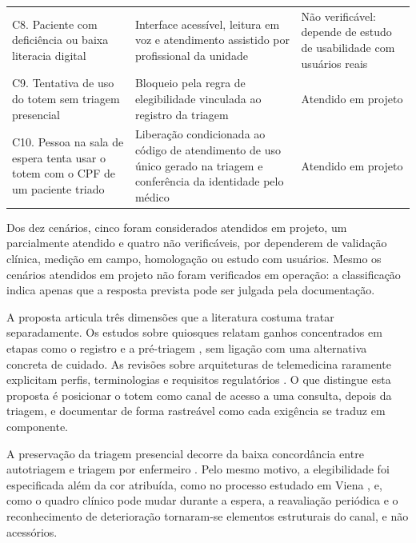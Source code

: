{\begin{longtable}{L{3.6cm} L{5.3cm} L{5.0cm}}
C8. Paciente com deficiência ou baixa literacia digital & Interface acessível, leitura em voz e atendimento assistido por profissional da unidade & Não verificável: depende de estudo de usabilidade com usuários reais \\
C9. Tentativa de uso do totem sem triagem presencial & Bloqueio pela regra de elegibilidade vinculada ao registro da triagem & Atendido em projeto \\
C10. Pessoa na sala de espera tenta usar o totem com o CPF de um paciente triado & Liberação condicionada ao código de atendimento de uso único gerado na triagem e conferência da identidade pelo médico & Atendido em projeto \\
\end{longtable}
}

Dos dez cenários, cinco foram considerados atendidos em projeto, um parcialmente atendido e quatro não verificáveis, por dependerem de validação clínica, medição em campo, homologação ou estudo com usuários. Mesmo os cenários atendidos em projeto não foram verificados em operação: a classificação indica apenas que a resposta prevista pode ser julgada pela documentação.

\label{sec:res-discussao}


A proposta articula três dimensões que a literatura costuma tratar separadamente. Os estudos sobre quiosques relatam ganhos concentrados em etapas como o registro e a pré-triagem \cite{joseph2023}, sem ligação com uma alternativa concreta de cuidado. As revisões sobre arquiteturas de telemedicina raramente explicitam perfis, terminologias e requisitos regulatórios \cite{jat2024}. O que distingue esta proposta é posicionar o totem como canal de acesso a uma consulta, depois da triagem, e documentar de forma rastreável como cada exigência se traduz em componente.

A preservação da triagem presencial decorre da baixa concordância entre autotriagem e triagem por enfermeiro \cite{dickson2022}. Pelo mesmo motivo, a elegibilidade foi especificada além da cor atribuída, como no processo estudado em Viena \cite{sorznechay2025}, e, como o quadro clínico pode mudar durante a espera, a reavaliação periódica e o reconhecimento de deterioração tornaram-se elementos estruturais do canal, e não acessórios.


